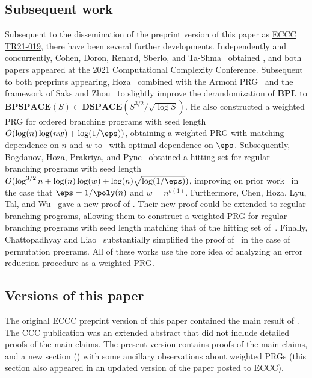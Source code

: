 \subsection{Subsequent work}
Subsequent to the dissemination of the preprint version of this %
paper %
%
%
%
%
%
%
as \href{https://eccc.weizmann.ac.il/report/2021/019/}{ECCC TR21-019},
there have been several further developments. Independently and concurrently, Cohen, Doron, Renard, Sberlo, and Ta-Shma~\cite{CohenDoReSbTa21} obtained , and both papers appeared at the 2021 Computational Complexity Conference. 
%
Subsequent to both preprints appearing, Hoza~\cite{Hoza21} combined  with the Armoni PRG~\cite{Armoni98} and the framework of Saks and Zhou~\cite{SaksZh99} to slightly improve the derandomization of $\mathbf{BPL}$ to %
$\mathbf{BPSPACE}(S)\subset \mathbf{DSPACE}(S^{3/2}/\sqrt{\log S})$. %
He also constructed a weighted PRG for ordered branching programs with seed length $O(\log(n)\log(nw)+\log(1/\eps))$, obtaining a weighted PRG with matching dependence on $n$ and $w$ to~\cite{Nisan92} with optimal dependence on $\eps$. 
%
%
Subsequently, 
%
Bogdanov, Hoza, Prakriya, and Pyne~\cite{BHPP22} obtained a hitting set for regular branching programs with seed length $O(\log^{3/2}n+\log(n)\log(w)+\log(n)\sqrt{\log(1/\eps)})$, improving on prior work~\cite{BravermanRaRaYe10} in the case that $\eps=1/\poly(n)$ and $w=n^{o(1)}$. %
%
Furthermore, Chen, Hoza, Lyu, Tal, and Wu~\cite{CHLTW23} gave a new proof of . Their new proof could be extended to regular branching programs, allowing them to construct a weighted PRG for regular branching programs with seed length matching that of the hitting set of~\cite{BHPP22}. Finally, Chattopadhyay and Liao~\cite{CL24} substantially simplified the proof of~\cite{CHLTW23} in the case of permutation programs. All of these works use the core idea of analyzing an error reduction procedure as a weighted PRG.

\subsection{Versions of this paper}
The original ECCC preprint version of this paper contained the main result of . The CCC publication was an extended abstract that did not include detailed proofs of the main claims. The present version contains proofs of the main claims, and a new section () with some ancillary observations about weighted PRGs (this section also appeared in an updated version of the paper posted to ECCC).
%

